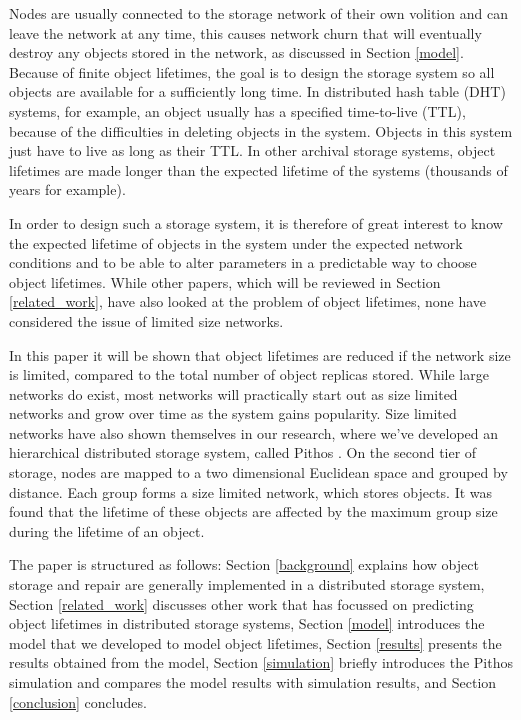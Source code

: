 \documentclass[10pt,a4paper,conference]{IEEEtran}
\begin{document}
Nodes are usually connected to the storage network of their own volition and can leave the network at any time, this causes network churn that will eventually destroy any objects stored in the network, as discussed in Section \ref{model}. Because of finite object lifetimes, the goal is to design the storage system so all objects are available for a sufficiently long time. In distributed hash table (DHT) systems, for example, an object usually has a specified time-to-live (TTL), because of the difficulties in deleting objects in the system. Objects in this system just have to live as long as their TTL. In other archival storage systems, object lifetimes are made longer than the expected lifetime of the systems (thousands of years for example).

In order to design such a storage system, it is therefore of great interest to know the expected lifetime of objects in the system under the expected network conditions and to be able to alter parameters in a predictable way to choose object lifetimes. While other papers, which will be reviewed in Section \ref{related_work}, have also looked at the problem of object lifetimes, none have considered the issue of limited size networks.

In this paper it will be shown that object lifetimes are reduced if the network size is limited, compared to the total number of object replicas stored. While large networks do exist, most networks will practically start out as size limited networks and grow over time as the system gains popularity. Size limited networks have also shown themselves in our research, where we've developed an hierarchical distributed storage system, called Pithos \cite{Pithos_mmve_2011}. On the second tier of storage, nodes are mapped to a two dimensional Euclidean space and grouped by distance. Each group forms a size limited network, which stores objects. It was found that the lifetime of these objects are affected by the maximum group size during the lifetime of an object.

The paper is structured as follows: Section \ref{background} explains how object storage and repair are generally implemented in a distributed storage system,
%
Section \ref{related_work} discusses other work that has focussed on predicting object lifetimes in distributed storage systems,
%
Section \ref{model} introduces the model that we developed to model object lifetimes,
%
Section \ref{results} presents the results obtained from the model,
%
Section \ref{simulation} briefly introduces the Pithos simulation and compares the model results with simulation results, and
%
Section \ref{conclusion} concludes.
\end{document}
